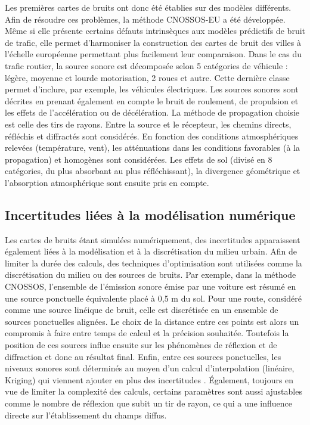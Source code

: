Les premières cartes de bruits ont donc été établies sur des modèles différents.
Afin de résoudre ces problèmes, la méthode CNOSSOS-EU \cite{CNOSSOS,kephalopoulos} a été développée. Même si elle présente certains défauts intrinsèques aux modèles prédictifs de bruit de trafic, elle permet d'harmoniser la construction des cartes de bruit des villes à l'échelle européenne permettant plus facilement leur comparaison. Dans le cas du trafic routier, la source sonore est décomposée selon 5 catégories de véhicule : légère, moyenne et lourde motorisation, 2 roues et autre. Cette dernière classe permet d'inclure, par exemple, les véhicules électriques. Les sources sonores sont décrites en prenant également en compte le bruit de roulement, de propulsion et les effets de l'accélération ou de décélération.
La méthode de propagation choisie est celle des tirs de rayons. Entre la source et le récepteur, les chemins directs, réfléchis et diffractés sont considérés. En fonction des conditions atmosphériques relevées (température, vent), les atténuations dans les conditions favorables (à la propagation) et homogènes sont considérées. Les effets de sol (divisé en 8 catégories, du plus absorbant au plus réfléchissant), la divergence géométrique et l'absorption atmosphérique sont ensuite pris en compte.


\subsection{Incertitudes liées à la modélisation numérique}

Les cartes de bruits étant simulées numériquement, des incertitudes apparaissent également liées à la modélisation et à la discrétisation du milieu urbain. Afin de limiter la durée des calculs, des techniques d'optimisation sont utilisées comme la discrétisation du milieu ou des sources de bruits. Par exemple, dans la méthode CNOSSOS, l'ensemble de l'émission sonore émise par une voiture est résumé en une source ponctuelle équivalente placé à 0,5 m du sol. Pour une route, considéré comme une source linéique de bruit, celle est discrétisée en un ensemble de sources ponctuelles alignées. Le choix de la distance entre ces points est alors un compromis à faire entre temps de calcul et la précision souhaitée. Toutefois la position de ces sources influe ensuite sur les phénomènes de réflexion et de diffraction et donc au résultat final. Enfin, entre ces sources ponctuelles, les niveaux sonores sont déterminés au moyen d'un calcul d'interpolation (linéaire, Kriging) qui viennent ajouter en plus des incertitudes \cite{van_leeuwen_noise_2015}.
Également, toujours en vue de limiter la complexité des calculs, certains paramètres sont aussi ajustables comme le nombre de réflexion que subit un tir de rayon, ce qui a une influence directe sur l'établissement du champs diffus.

